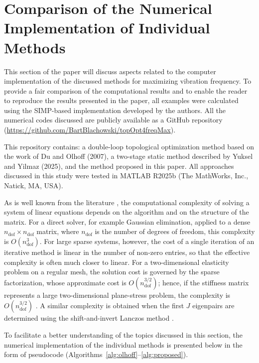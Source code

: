 \documentclass[applsci,article,submit,pdftex,moreauthors]{Definitions/mdpi}
\begin{document}
\section{Comparison of the Numerical Implementation of Individual Methods}

This section of the paper will discuss aspects related to the computer implementation of the discussed methods for maximizing vibration frequency. To provide a fair comparison of the computational results and to enable the reader to reproduce the results presented in the paper, all examples were calculated using the SIMP-based implementation developed by the authors. All the numerical codes discussed are publicly available as a GitHub repository (\href{https://github.com/BartBlachowski/topOpt4freqMax}{https://github.com/BartBlachowski/topOpt4freqMax}).

This repository contains: a double-loop topological optimization method based on the work of Du and Olhoff (2007), a two-stage static method described by Yuksel and Yilmaz (2025), and the method proposed in this paper. All approaches discussed in this study were tested in MATLAB R2025b (The MathWorks, Inc., Natick, MA, USA).

As is well known from the literature \citep{George1973,Davis2006}, the computational complexity of solving a system of linear equations depends on the algorithm and on the structure of the matrix. For a direct solver, for example Gaussian elimination, applied to a dense $n_\mathrm{dof} \times n_\mathrm{dof}$ matrix, where $n_\mathrm{dof}$ is the number of degrees of freedom, this complexity is $O(n_\mathrm{dof}^3)$. For large sparse systems, however, the cost of a single iteration of an iterative method is linear in the number of non-zero entries, so that the effective complexity is often much closer to linear. For a two-dimensional elasticity problem on a regular mesh, the solution cost is governed by the sparse factorization, whose approximate cost is $O(n_\mathrm{dof}^{3/2})$; hence, if the stiffness matrix represents a large two-dimensional plane-stress problem, the complexity is $O(n_\mathrm{dof}^{3/2})$ \citep{George1973,Davis2006}. A similar complexity is obtained when the first $J$ eigenpairs are determined using the shift-and-invert Lanczos method \citep{Saad2011}.

To facilitate a better understanding of the topics discussed in this section, the numerical implementation of the individual methods is presented below in the form of pseudocode (Algorithms~\ref{alg:olhoff}--\ref{alg:proposed}).
\end{document}
